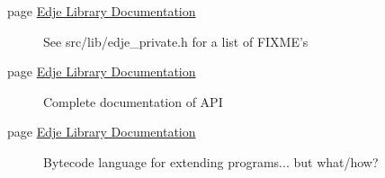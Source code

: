 \label{todo__todo000001}
\hypertarget{todo__todo000001}{}
 \begin{description}
\item[page \hyperlink{index}{Edje Library Documentation} ]See src/lib/edje\_\-private.h for a list of FIXME's \end{description}


\label{todo__todo000001}
\hypertarget{todo__todo000001}{}
 \begin{description}
\item[page \hyperlink{index}{Edje Library Documentation} ]Complete documentation of API \end{description}


\label{todo__todo000001}
\hypertarget{todo__todo000001}{}
 \begin{description}
\item[page \hyperlink{index}{Edje Library Documentation} ]Bytecode language for extending programs... but what/how?

\end{description}
